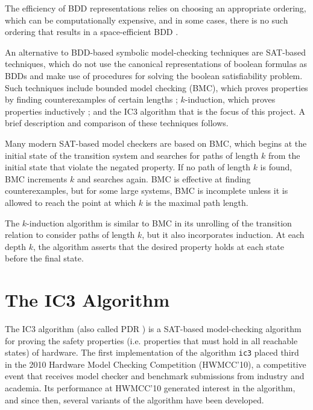 \documentclass[12pt,a4paper,twoside,openright]{report}
\begin{document}
The efficiency of BDD representations relies on choosing an appropriate
ordering, which can be computationally expensive, and in some cases,
there is no such ordering that results in a space-efficient BDD
\cite{biere99a}.

An alternative to BDD-based symbolic model-checking techniques are SAT-based
techniques, which do not use the canonical representations of boolean
formulas as BDDs and make use of procedures for solving the boolean
satisfiability problem.
Such techniques include bounded model checking (BMC),
which proves properties by finding counterexamples of certain lengths
\cite{biere99a};
$k$-induction, which proves properties inductively \cite{sheeran00};
and the IC3 algorithm that is the focus of this project.
A brief description and comparison of these techniques follows.

Many modern SAT-based model checkers are based on BMC, which begins at the
initial state of the transition system and searches for paths of length
$k$ from the initial state that violate the negated property.
If no path of length $k$ is found, BMC increments $k$ and searches again.
BMC is effective at finding counterexamples, but for some large systems,
BMC is incomplete unless it is allowed to reach the point at which $k$ is
the maximal path length.

The $k$-induction algorithm is similar to BMC in its unrolling of the
transition relation to consider paths of length $k$, but it also
incorporates induction. At each depth $k$, the algorithm asserts that the
desired property holds at each state before the final state.


\section{The IC3 Algorithm}


The IC3 algorithm (also called PDR \cite{een11}) is a SAT-based model-checking
algorithm for proving the safety properties (i.e. properties that must hold
in all reachable states) of hardware.
The first implementation of the algorithm \verb,ic3, placed third in
the 2010 Hardware Model Checking Competition (HWMCC'10), a competitive event
that receives model checker and benchmark submissions from industry and
academia. Its performance at HWMCC'10 generated interest in the algorithm, and
since then, several variants of the algorithm have been developed.
\end{document}
